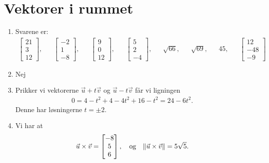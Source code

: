\section{Vektorer i rummet}
\begin{enumerate}
	\item Svarene er:
	\begin{align*}
	\begin{bmatrix}
	21\\3\\12
	\end{bmatrix},&&\begin{bmatrix}
	-2\\1\\-8
	\end{bmatrix},&&\begin{bmatrix}
	9\\0\\12
	\end{bmatrix},&&\begin{bmatrix}
	5\\2\\-4
	\end{bmatrix},&&\sqrt{66},&&\sqrt{69},&&45,&& \begin{bmatrix}
	12\\-48\\-9
	\end{bmatrix}
	\end{align*}
	
	\item Nej
	
	\item Prikker vi vektorerne $\vec{u}+t\vec{v}$ og $\vec{u}-t\vec{v}$ får vi ligningen
	\begin{align*}
	0=4-t^2+4-4t^2+16-t^2=24-6t^2.
	\end{align*}
	Denne har løsningerne $t=\pm 2$.
	
	\item Vi har at
	\begin{align*}
	\vec{u}\times \vec{v}=\begin{bmatrix}
	-8\\5\\6
	\end{bmatrix},\quad \textup{og}\quad \Vert \vec{u}\times \vec{v}\Vert=5\sqrt{5}.
	\end{align*}


\end{enumerate}
